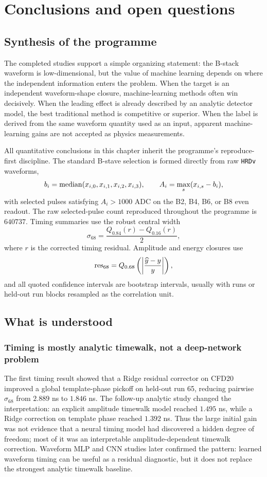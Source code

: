 \chapter{Conclusions and open questions}

\section{Synthesis of the programme}

The completed studies support a simple organizing statement: the B-stack waveform is
low-dimensional, but the value of machine learning depends on where the independent
information enters the problem.  When the target is an independent waveform-shape
closure, machine-learning methods often win decisively.  When the leading effect is
already described by an analytic detector model, the best traditional method is
competitive or superior.  When the label is derived from the same waveform quantity
used as an input, apparent machine-learning gains are not accepted as physics
measurements.

All quantitative conclusions in this chapter inherit the programme's reproduce-first
discipline.  The standard B-stave selection is formed directly from raw \texttt{HRDv}
waveforms,
\[
  b_i = {\rm median}(x_{i,0},x_{i,1},x_{i,2},x_{i,3}), \qquad
  A_i = \max_s (x_{i,s}-b_i),
\]
with selected pulses satisfying \(A_i>1000\) ADC on the B2, B4, B6, or B8 even
readout.  The raw selected-pulse count reproduced throughout the programme is
\(640737\).  Timing summaries use the robust central width
\[
  \sigma_{68} = \frac{Q_{0.84}(r)-Q_{0.16}(r)}{2},
\]
where \(r\) is the corrected timing residual.  Amplitude and energy closures use
\[
  {\rm res}_{68}=Q_{0.68}\left(\left|\frac{\widehat{y}-y}{y}\right|\right),
\]
and all quoted confidence intervals are bootstrap intervals, usually with runs or
held-out run blocks resampled as the correlation unit.

\section{What is understood}

\subsection{Timing is mostly analytic timewalk, not a deep-network problem}

The first timing result showed that a Ridge residual corrector on CFD20 improved a
global template-phase pickoff on held-out run 65, reducing pairwise \(\sigma_{68}\)
from \(2.889\) ns to \(1.846\) ns.  The follow-up analytic study changed the
interpretation: an explicit amplitude timewalk model reached \(1.495\) ns, while a
Ridge correction on template phase reached \(1.392\) ns.  Thus the large initial
gain was not evidence that a neural timing model had discovered a hidden degree of
freedom; most of it was an interpretable amplitude-dependent timewalk correction.
Waveform MLP and CNN studies later confirmed the pattern: learned waveform timing can
be useful as a residual diagnostic, but it does not replace the strongest analytic
timewalk baseline.

